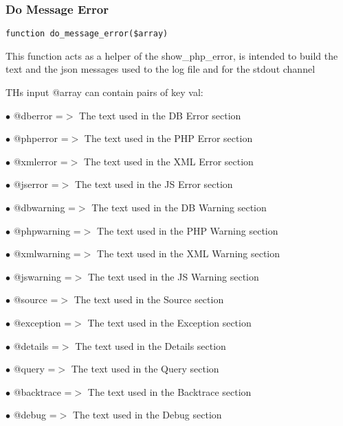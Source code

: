\documentclass[a4paper]{article}
\begin{document}
\hypertarget{toc112}{}
\subsubsection{Do Message Error}

\begin{lstlisting}
function do_message_error($array)
\end{lstlisting}

This function acts as a helper of the show\_php\_error, is intended to build
the text and the json messages used to the log file and for the stdout channel

THs input @array can contain pairs of key val:

\begin{compactitem}
\item[\color{myblue}$\bullet$] @dberror    =$>$ The text used in the DB Error section
\item[\color{myblue}$\bullet$] @phperror   =$>$ The text used in the PHP Error section
\item[\color{myblue}$\bullet$] @xmlerror   =$>$ The text used in the XML Error section
\item[\color{myblue}$\bullet$] @jserror    =$>$ The text used in the JS Error section
\item[\color{myblue}$\bullet$] @dbwarning  =$>$ The text used in the DB Warning section
\item[\color{myblue}$\bullet$] @phpwarning =$>$ The text used in the PHP Warning section
\item[\color{myblue}$\bullet$] @xmlwarning =$>$ The text used in the XML Warning section
\item[\color{myblue}$\bullet$] @jswarning  =$>$ The text used in the JS Warning section
\item[\color{myblue}$\bullet$] @source     =$>$ The text used in the Source section
\item[\color{myblue}$\bullet$] @exception  =$>$ The text used in the Exception section
\item[\color{myblue}$\bullet$] @details    =$>$ The text used in the Details section
\item[\color{myblue}$\bullet$] @query      =$>$ The text used in the Query section
\item[\color{myblue}$\bullet$] @backtrace  =$>$ The text used in the Backtrace section
\item[\color{myblue}$\bullet$] @debug      =$>$ The text used in the Debug section
\end{compactitem}
\end{document}
